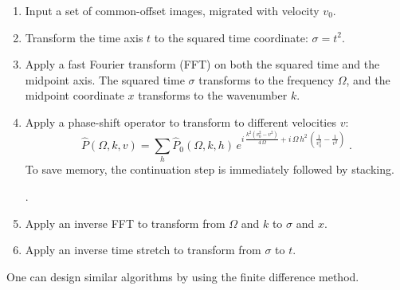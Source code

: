 \begin{enumerate}
  \item Input a set of common-offset images, migrated with velocity $v_0$.
  \item Transform the time axis $t$ to the squared time coordinate:
    $\sigma=t^2$.
  \item Apply a fast Fourier transform (FFT) on both the squared time
    and the midpoint axis. The squared time $\sigma$ transforms to the
    frequency $\Omega$, and the midpoint coordinate $x$ transforms to
    the wavenumber $k$. 
  \item Apply a phase-shift operator to transform to different velocities $v$:
    \begin{equation}
      \label{eqn:zophase2}
      \hat{P}(\Omega,k,v) = \sum_{h} \hat{P}_0 (\Omega,k,h)\,
      e^{i\,\frac{k^2\left(v_0^2 - v^2\right)}{4\,\Omega} +
        i\,\Omega\,h^2\, \left(\frac{1}{v_0^2} -
          \frac{1}{v^2}\right)}\;.
    \end{equation}
    To save memory, the continuation step is immediately followed
    by stacking. 
    \cite[]{GEO36-03-04820497} 
    
   \cite[]{yilmaz}.

  \item Apply an inverse FFT to transform from $\Omega$ and $k$ to
    $\sigma$ and $x$.
  \item Apply an inverse time stretch to transform from $\sigma$ to $t$.
  \end{enumerate}  
  One can design similar algorithms by using the finite difference method.


